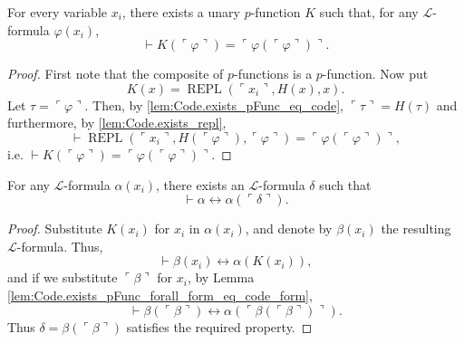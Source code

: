 \begin{lemma}
    \label{lem:Code.exists_pFunc_forall_form_eq_code_form}
    \leanok
    For every variable $x_i$, there exists a unary $p$-function $K$ such that, 
    for any $\mathcal{L}$-formula $\varphi(x_i)$,
    $$
    \vdash K (\ulcorner{\varphi}\urcorner) = 
    \ulcorner{\varphi(\ulcorner {\varphi} \urcorner)}\urcorner.
    $$
\end{lemma}

\begin{proof}
    First note that the composite of $p$-functions is a $p$-function.
    Now put
    $$
    K(x) = \operatorname{REPL}(\ulcorner{x_i}\urcorner, H(x), x).
    $$
    Let $\tau = \ulcorner{\varphi}\urcorner$.
    Then, by \ref{lem:Code.exists_pFunc_eq_code}, $\ulcorner{\tau}\urcorner = H (\tau)$ and
    furthermore, by \ref{lem:Code.exists_repl},
    $$
    \vdash \operatorname{REPL}(\ulcorner{x_i}\urcorner, H(\ulcorner{\varphi}\urcorner), 
    \ulcorner{\varphi}\urcorner) = \ulcorner{\varphi(\ulcorner {\varphi} \urcorner)}\urcorner,
    $$
    i.e. $\vdash K (\ulcorner{\varphi}\urcorner)=
    \ulcorner{\varphi(\ulcorner {\varphi} \urcorner)}\urcorner$.
\end{proof}

\begin{theorem}
    \label{thm:diagonal}
    \leanok
    For any $\mathcal{L}$-formula $\alpha(x_i)$, there exists an $\mathcal{L}$-formula 
    $\delta$ such that 
    $$
    \vdash \alpha \leftrightarrow \alpha(\ulcorner{\delta}\urcorner).
    $$
\end{theorem}

\begin{proof}
    Substitute $K(x_i)$ for $x_i$ in $\alpha(x_i)$, 
    and denote by $\beta(x_i)$ the resulting $\mathcal{L}$-formula.
    Thus,
    $$
    \vdash \beta(x_i) \leftrightarrow \alpha(K(x_i)),
    $$
    and if we substitute $\ulcorner{\beta}\urcorner$ for $x_i$, 
    by Lemma \ref{lem:Code.exists_pFunc_forall_form_eq_code_form},
    $$
    \vdash \beta(\ulcorner{\beta}\urcorner) \leftrightarrow 
    \alpha(\ulcorner{\beta(\ulcorner{\beta}\urcorner)}\urcorner).
    $$
    Thus $\delta = \beta(\ulcorner{\beta}\urcorner)$ satisfies the required property.
\end{proof}

